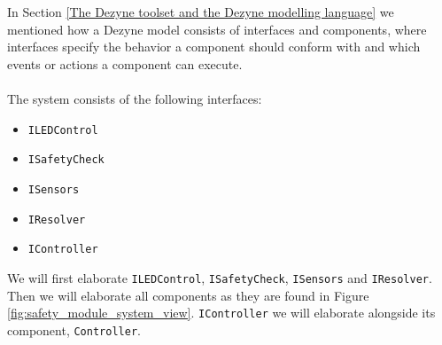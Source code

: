 \documentclass[12pt]{scrreprt}
\begin{document}
\par
In Section \ref{The Dezyne toolset and the Dezyne modelling language} we mentioned how a Dezyne model consists of interfaces and components, where interfaces specify the behavior a component should conform with and which events or actions a component can execute.%
\\\\
The system consists of the following interfaces:

\begin{itemize}
    \item \texttt{ILEDControl}
    \item \texttt{ISafetyCheck}
    \item \texttt{ISensors}
    \item \texttt{IResolver}
    \item \texttt{IController}
\end{itemize}

We will first elaborate \texttt{ILEDControl}, \texttt{ISafetyCheck}, \texttt{ISensors} and \texttt{IResolver}. Then we will elaborate all components as they are found in Figure \ref{fig:safety_module_system_view}. \texttt{IController} we will elaborate alongside its component, \texttt{Controller}.
\end{document}
